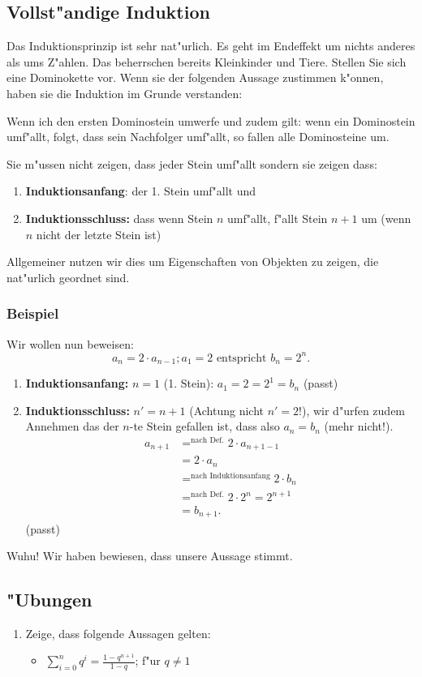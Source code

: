 \subsection{Vollst"andige Induktion}
Das Induktionsprinzip ist sehr nat"urlich. Es geht im Endeffekt um nichts anderes als ums Z"ahlen. Das beherrschen bereits Kleinkinder und Tiere. Stellen Sie sich eine Dominokette vor. Wenn sie der folgenden Aussage zustimmen k"onnen, haben sie die Induktion im Grunde verstanden:
\begin{center}
Wenn ich den ersten Dominostein umwerfe und zudem gilt: wenn ein Dominostein umf"allt, folgt, dass sein Nachfolger umf"allt, so fallen alle Dominosteine um.
\end{center}
Sie m"ussen nicht zeigen, dass jeder Stein umf"allt sondern sie zeigen dass:
\begin{enumerate}
\item \textbf{Induktionsanfang}: der 1. Stein umf"allt und
\item \textbf{Induktionsschluss:} dass wenn Stein $n$ umf"allt, f"allt Stein $n+1$ um (wenn $n$ nicht der letzte Stein ist)
\end{enumerate}
Allgemeiner nutzen wir dies um Eigenschaften von Objekten zu zeigen, die nat"urlich geordnet sind.

\subsubsection{Beispiel}
Wir wollen nun beweisen:
\begin{equation}
a_{n} = 2 \cdot a_{n-1}; a_1 = 2 \text{ entspricht } b_n = 2^n.
\end{equation}
\begin{enumerate}
\item \textbf{Induktionsanfang:} $n = 1$ (1. Stein): $ a_1 = 2 = 2^1 = b_n$ (passt)
\item \textbf{Induktionsschluss:} $n' = n + 1$ (Achtung nicht $n' = 2$!), wir d"urfen zudem Annehmen das der $n$-te Stein gefallen ist, dass also $a_n = b_n$ (mehr nicht!).
\begin{align*}
a_{n+1} &=^{\text{nach Def.}} 2 \cdot a_{n+1-1} \\
&=  2 \cdot a_{n} \\
&=^\text{nach Induktionsanfang} 2 \cdot b_n \\
&=^\text{nach Def.} 2 \cdot 2^n = 2^{n+1} \\
&= b_{n+1}.
\end{align*}
(passt)
\end{enumerate}
Wuhu! Wir haben bewiesen, dass unsere Aussage stimmt.

\subsection{"Ubungen}
\begin{enumerate}
\item Zeige, dass folgende Aussagen gelten:
\begin{itemize}
\item $\sum\limits_{i=0}^{n} q^i = \frac{1-q^{n+1}}{1-q}$; f"ur $q \neq 1$
\end{itemize}
\end{enumerate}